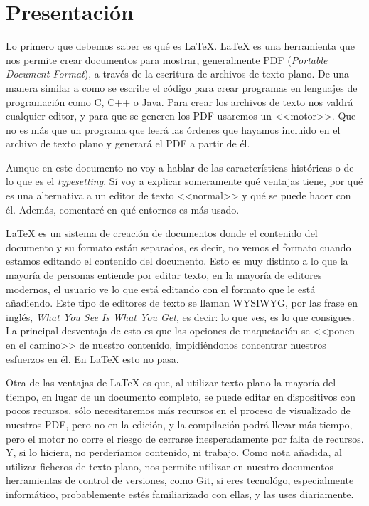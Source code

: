 \documentclass[a4paper]{article}
\begin{document}
\section{Presentación}
Lo primero que debemos saber es qué es \LaTeX{}. \LaTeX{} es una herramienta
que nos permite crear documentos para mostrar, generalmente PDF
(\textit{Portable Document Format}), a través de la escritura de archivos de
texto plano. De una manera similar a como se escribe el código para crear
programas en lenguajes de programación como C, C++ o Java. Para crear los
archivos de texto nos valdrá cualquier editor, y para que se generen los PDF
usaremos un <<motor>>. Que no es más que un programa que leerá las órdenes
que hayamos incluido en el archivo de texto plano y generará el PDF a partir de
él.

Aunque en este documento no voy a hablar de las características históricas o de
lo que es el \textit{typesetting}. Sí voy a explicar someramente qué ventajas
tiene, por qué es una alternativa a un editor de texto <<normal>> y qué se puede
hacer con él. Además, comentaré en qué entornos es más usado.

\LaTeX{} es un sistema de creación de documentos donde el contenido del
documento y su formato están separados, es decir, no vemos el formato cuando
estamos editando el contenido del documento. Esto es muy distinto a lo que la 
mayoría de personas entiende por editar texto, en la mayoría de editores
modernos, el usuario ve lo que está editando con el formato que le está
añadiendo. Este tipo de editores de texto se llaman WYSIWYG, por las frase en
inglés, \textit{What You See Is What You Get}, es decir: lo que ves, es lo que
consigues. La principal desventaja de esto es que las opciones de maquetación
se <<ponen en el camino>> de nuestro contenido, impidiéndonos concentrar
nuestros esfuerzos en él. En \LaTeX{} esto no pasa.

Otra de las ventajas de \LaTeX{} es que, al utilizar texto plano la mayoría del
tiempo, en lugar de un documento completo, se puede editar en dispositivos con
pocos recursos, sólo necesitaremos más recursos en el proceso de visualizado de
nuestros PDF, pero no en la edición, y la compilación podrá llevar más tiempo,
pero el motor no corre el riesgo de cerrarse inesperadamente por falta de
recursos. Y, si lo hiciera, no perderíamos contenido, ni trabajo. Como nota
añadida, al utilizar ficheros de texto plano, nos permite utilizar en nuestro
documentos herramientas de control de versiones, como Git, si eres tecnológo,
especialmente informático, probablemente estés familiarizado con ellas, y las
uses diariamente.
\end{document}
